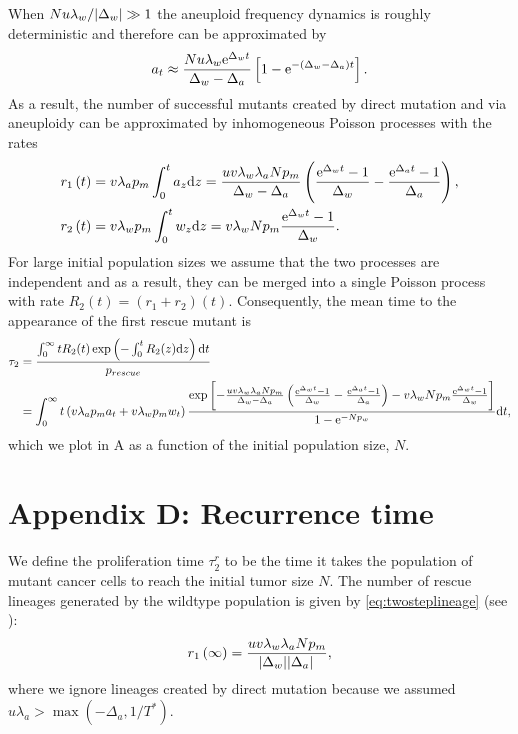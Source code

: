 \documentclass[12pt]{extarticle}
\renewcommand{\d}[1]{\ensuremath{\operatorname{d}\!{#1}}}
\renewcommand{\d}{{\rm d}}
\newcommand{\e}{{\rm e}}
\begin{document}
\begin{appendices}
When $Nu\lambda_w/\abs{\Delta_w}\gg1$ the aneuploid frequency dynamics is roughly deterministic and therefore can be approximated by 
\begin{equation}\label{aneuploidpopeq}
a_t \approx \frac{Nu\lambda_w\e^{\Delta_wt}}{\Delta_w-\Delta_a}\left[1-\e^{-\left(\Delta_w-\Delta_a\right)t}\right].
\end{equation}
As a result, the number of successful mutants created by direct mutation and via aneuploidy can be approximated by inhomogeneous Poisson processes with the rates
\begin{align}\label{eq:twosteplineage}
r_1\left(t\right)&=v\lambda_ap_m\int_0^ta_{z} \d z = \frac{uv\lambda_w\lambda_aNp_m}{\Delta_w-\Delta_a}\left(\frac{\e^{\Delta_wt}-1}{\Delta_w}-\frac{\e^{\Delta_at}-1}{\Delta_a}\right),\\ \label{eq:twosteplineagedirect}
r_2\left(t\right)&=v\lambda_wp_m\int_0^tw_{z} \d z = v\lambda_wNp_m\frac{\e^{\Delta_w t}-1}{\Delta_w}.
\end{align}
For large initial population sizes we assume that the two processes are independent and as a result, they can be merged into a single Poisson process with rate $R_2(t)=\left(r_1+r_2\right)\left(t\right)$.
Consequently, the mean time to the appearance of the first rescue mutant is
\begin{align}\nonumber
\tau_2 &= \frac{\int_{0}^{\infty}{tR_2(t)\exp\left(-\int_0^{t}{R_2(z)\d z}\right) \d t}}{p_{rescue}}\\ \label{meantimet2}
&=
\int_0^\infty t\left(v\lambda_ap_ma_t+v\lambda_wp_mw_t\right)\frac{\exp\left[-\frac{uv\lambda_w\lambda_aNp_m}{\Delta_w-\Delta_a}\left(\frac{\e^{\Delta_w t}-1}{\Delta_w}-\frac{\e^{\Delta_a t}-1}{\Delta_a}\right)-v\lambda_wNp_m\frac{\e^{\Delta_w t}-1}{\Delta_w}\right] }{1-\e^{-Np_w}}\d t,
\end{align}
which we plot in A as a function of the initial population size, $N$.
\section*{Appendix D: Recurrence time}
We define the proliferation time $\tau_2^r$  to be the time it takes the population of mutant cancer cells to reach the initial tumor size $N$. The number of rescue lineages generated by the wildtype population is given by  \cref{eq:twosteplineage} (see ):
\begin{equation*}
r_1\left(\infty\right)=\frac{uv\lambda_w\lambda_aNp_m}{\abs{\Delta_w}\abs{\Delta_a}},
\end{equation*}
where we ignore lineages created by direct mutation because we assumed $u\lambda_a > \max{(-\Delta_a, 1/T^*)}$.


\end{appendices}
\end{document}
